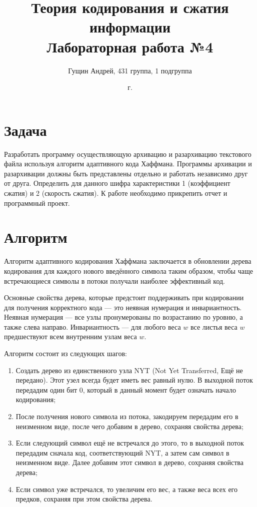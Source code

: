 \documentclass[a4paper,oneside]{article}
\title{{Теория кодирования и сжатия информации}\\{Лабораторная работа №4}}
\author{Гущин Андрей, 431 группа, 1 подгруппа}
\date{\the\year{} г.}
\theoremstyle{definition}
\begin{document}
\maketitle

\section{Задача}

Разработать программу осуществляющую архивацию и разархивацию текстового
файла используя алгоритм адаптивного кода Хаффмана. Программы архивации и
разархивации должны быть представлены отдельно и работать независимо друг от
друга. Определить для данного шифра характеристики 1 (коэффициент сжатия) и 2
(скорость сжатия). К работе необходимо прикрепить отчет и программный проект.


\section{Алгоритм}

Алгоритм адаптивного кодирования Хаффмана заключается в обновлении дерева
кодирования для каждого нового введённого символа таким образом, чтобы
чаще встречающиеся символы в потоки получали наиболее эффективный код.

Основные свойства дерева, которые предстоит поддерживать при кодировании для
получения корректного кода --- это неявная нумерация и инвариантность. Неявная
нумерация --- все узлы пронумерованы по возрастанию по уровню, а также слева
направо. Инвариантность --- для любого веса $w$ все листья веса $w$ предшествуют
всем внутренним узлам веса $w$.

Алгоритм состоит из следующих шагов:
\begin{enumerate}
  \item
    Создать дерево из единственного узла NYT (Not Yet Transferred, Ещё не
    передано). Этот узел всегда будет иметь вес равный нулю. В выходной поток
    передадим один бит 0, который в данный момент будет означать начало
    кодирования;
  \item
    После получения нового символа из потока, закодируем передадим его в
    неизменном виде, после чего добавим в дерево, сохраняя свойства дерева;
  \item
    Если следующий символ ещё не встречался до этого, то в выходной поток
    передадим сначала код, соответствующий NYT, а затем сам символ в неизменном
    виде. Далее добавим этот символ в дерево, сохраняя свойства дерева;
  \item
    Если символ уже встречался, то увеличим его вес, а также веса всех его
    предков, сохраняя при этом свойства дерева.
\end{enumerate}
\end{document}
